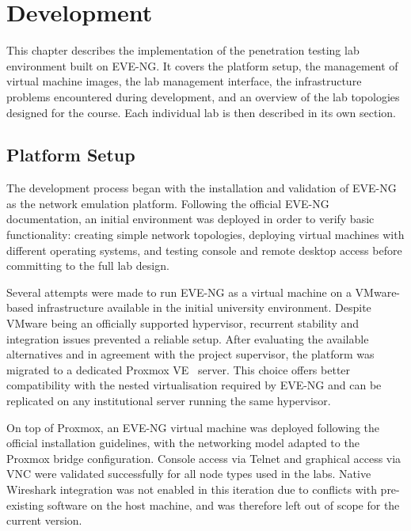 
\chapter{Development}

This chapter describes the implementation of the penetration testing lab environment
built on EVE-NG. It covers the platform setup, the management of virtual machine
images, the lab management interface, the infrastructure problems encountered during
development, and an overview of the lab topologies designed for the course. Each
individual lab is then described in its own section.


\section{Platform Setup}

The development process began with the installation and validation of EVE-NG~\cite{eve_ng} as the
network emulation platform. Following the official EVE-NG documentation, an initial
environment was deployed in order to verify basic functionality: creating simple
network topologies, deploying virtual machines with different operating systems, and
testing console and remote desktop access before committing to the full lab design.

Several attempts were made to run EVE-NG as a virtual machine on a VMware-based
infrastructure available in the initial university environment. Despite VMware being
an officially supported hypervisor, recurrent stability and integration issues
prevented a reliable setup. After evaluating the available alternatives and in
agreement with the project supervisor, the platform was migrated to a dedicated
Proxmox VE~\cite{proxmox} server. This choice offers better compatibility with the nested
virtualisation required by EVE-NG and can be replicated on any institutional server
running the same hypervisor.

On top of Proxmox, an EVE-NG virtual machine was deployed following the official
installation guidelines, with the networking model adapted to the Proxmox bridge
configuration. Console access via Telnet and graphical access via VNC were validated
successfully for all node types used in the labs. Native Wireshark integration was
not enabled in this iteration due to conflicts with pre-existing software on the host
machine, and was therefore left out of scope for the current version.


